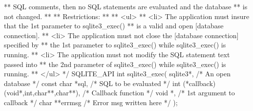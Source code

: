 \begin{Codex}[label=sqlite3.h,numbers=left]
{** SQL comments, then no SQL statements are evaluated and the database
** is not changed.
**
** Restrictions:
**
** <ul>
** <li> The application must insure that the 1st parameter to sqlite3_exec()
**      is a valid and open [database connection].
** <li> The application must not close the [database connection] specified by
**      the 1st parameter to sqlite3_exec() while sqlite3_exec() is running.
** <li> The application must not modify the SQL statement text passed into
**      the 2nd parameter of sqlite3_exec() while sqlite3_exec() is running.
** </ul>
*/
SQLITE_API int sqlite3_exec(
  sqlite3*,                                  /* An open database */
  const char *sql,                           /* SQL to be evaluated */
  int (*callback)(void*,int,char**,char**),  /* Callback function */
  void *,                                    /* 1st argument to callback */
  char **errmsg                              /* Error msg written here */
);

}
\end{Codex}
